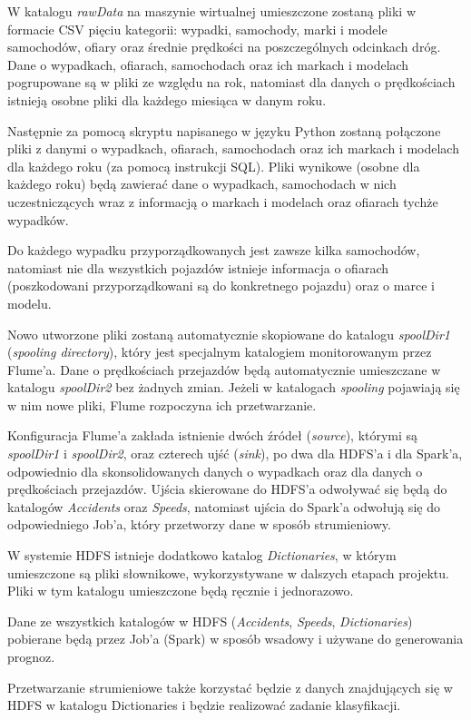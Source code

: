 \documentclass{article}
\begin{document}
W katalogu \textit{rawData} na maszynie wirtualnej umieszczone zostaną pliki w formacie CSV pięciu kategorii: wypadki, samochody, marki i modele samochodów, ofiary oraz średnie prędkości na poszczególnych odcinkach dróg. Dane o wypadkach, ofiarach, samochodach oraz ich markach i modelach pogrupowane są w pliki ze względu na rok, natomiast dla danych o prędkościach istnieją osobne pliki dla każdego miesiąca w danym roku.

Następnie za pomocą skryptu napisanego w języku Python zostaną połączone pliki z danymi o wypadkach, ofiarach, samochodach oraz ich markach i modelach dla każdego roku (za pomocą instrukcji SQL). Pliki wynikowe (osobne dla każdego roku) będą zawierać dane o wypadkach, samochodach w nich uczestniczących wraz z informacją o markach i modelach oraz ofiarach tychże wypadków.

Do każdego wypadku przyporządkowanych jest zawsze kilka samochodów, natomiast nie dla wszystkich pojazdów istnieje informacja o ofiarach (poszkodowani przyporządkowani są do konkretnego pojazdu) oraz o marce i modelu.

Nowo utworzone pliki zostaną automatycznie skopiowane do katalogu \textit{spoolDir1} (\textit{spooling directory}), który jest specjalnym katalogiem monitorowanym przez Flume’a. Dane o prędkościach przejazdów będą automatycznie umieszczane w katalogu \textit{spoolDir2} bez żadnych zmian. Jeżeli w katalogach \textit{spooling} pojawiają się w nim nowe pliki, Flume rozpoczyna ich przetwarzanie.

Konfiguracja Flume’a zakłada istnienie dwóch źródeł (\textit{source}), którymi są \textit{spoolDir1} i \textit{spoolDir2}, oraz czterech ujść (\textit{sink}), po dwa dla HDFS’a i dla Spark’a, odpowiednio dla skonsolidowanych danych o wypadkach oraz dla danych o prędkościach przejazdów. Ujścia skierowane do HDFS’a odwoływać się będą do katalogów \textit{Accidents} oraz \textit{Speeds}, natomiast ujścia do Spark’a odwołują się do odpowiedniego Job’a, który przetworzy dane w sposób strumieniowy.

W systemie HDFS istnieje dodatkowo katalog \textit{Dictionaries}, w którym umieszczone są pliki słownikowe, wykorzystywane w dalszych etapach projektu. Pliki w tym katalogu umieszczone będą ręcznie i jednorazowo.  

Dane ze wszystkich katalogów w HDFS (\textit{Accidents}, \textit{Speeds}, \textit{Dictionaries}) pobierane będą przez Job’a (Spark) w sposób wsadowy i używane do generowania prognoz.

Przetwarzanie strumieniowe także korzystać będzie z danych znajdujących się w HDFS w katalogu Dictionaries i będzie realizować zadanie klasyfikacji.
\end{document}
